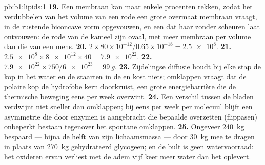 \begin{solution}{pb:b1:lipids:1}
\textbf{19.} Een membraan kan maar enkele procenten rekken, zodat het verdubbelen
van het volume van een rode  een grote overmaat membraan vraagt, in de
rustende biconcave vorm opgevouwen, en een  dat haar zonder scheuren
laat ontvouwen: de rode  van de kameel zijn ovaal, met meer membraan per
volume dan die van een mens.
\textbf{20.} $2\times 80\times 10^{-12}/0.65\times 10^{-18} = \num{2.5e8}$.
\textbf{21.} $\num{2.5e8}\times\num{8e12}\times 40 = \num{7.9e22}$.
\textbf{22.} $\num{7.9e22}\times 750/\num{6e23} = \qty{99}{g}$.
\textbf{23.} Zijdelingse diffusie houdt bij elke stap de kop in het water en de
staarten in de  en kost niets; omklappen vraagt dat de polaire kop de
hydrofobe kern doorkruist, een grote energiebarrière die de thermische beweging
eens per week overwint.
\textbf{24.} Een verschil tussen de bladen verdwijnt niet sneller dan 
omklappen; bij eens per week per molecuul blijft een asymmetrie die door enzymen
is aangebracht die bepaalde  overzetten (flippasen) onbeperkt bestaan
tegenover het spontane omklappen.
\textbf{25.} Ongeveer \qty{240}{kg} bespaard --- bijna de helft van zijn
lichaamsmassa --- door \qty{30}{kg}  mee te dragen in plaats van \qty{270}{kg}
gehydrateerd glycogeen; en de bult is geen watervoorraad: het oxideren ervan
verliest met de adem vijf keer meer water dan het oplevert.
\end{solution}
